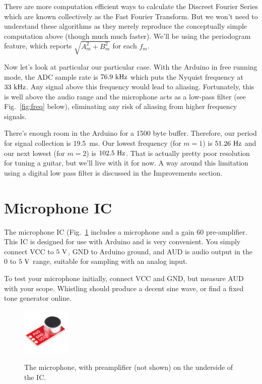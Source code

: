 \documentclass[12pt]{article}
\begin{document}
There are more computation efficient ways to calculate the Discreet Fourier Series which are known collectively as the Fast Fourier Transform.   But we won't need to understand these algorithms as they merely reproduce the conceptually simple computation above (though much much faster).  We'll be using the periodogram feature, which reports $\sqrt{A_m^2 + B_m^2}$ for each $f_m$.

Now let's look at particular our particular case.  With the Arduino in free running mode, the ADC sample rate is $76.9~\rm kHz$ which puts the Nyquist frequency at $33~\rm kHz$.  Any signal above this frequency would lead to aliasing.  Fortunately, this is well above the audio range and the microphone acts as a low-pass filter (see Fig.~\ref{fig:freq} below), eliminating any risk of aliasing from higher frequency signals.

There's enough room in the Arduino for a 1500 byte buffer.  Therefore, our period for signal collection is 
{19.5~\rm ms}.  Our lowest frequency (for $m=1$) is $51.26~\rm Hz$ and our next lowest (for $m=2$) is $102.5~\rm Hz$.   That is actually pretty poor resolution for tuning a guitar, but we'll live with it for now.  A way around this limitation using a digital low pass filter is discussed in the Improvements section.

\section{Microphone IC}

The microphone IC (Fig.~\ref{fig:mic} includes a microphone and a gain 60 pre-amplifier.  This IC is designed for use with Arduino and is very convenient.  You simply connect VCC to $5~\rm V$, GND to Arduino ground, and AUD is audio output in the $0$ to $5~\rm V$ range, suitable for sampling with an analog input.

To test your microphone initially, connect VCC and GND, but measure AUD with your scope.  Whistling should produce a decent sine wave, or find a fixed tone generator online.

\begin{figure}[htbp]
\begin{center}
{\includegraphics[width=0.20\textwidth]{figs/mic.jpg}}
\end{center}
\caption{\label{fig:mic} The microphone, with preamplifier (not shown) on the underside of the IC.}
\end{figure}
\end{document}
